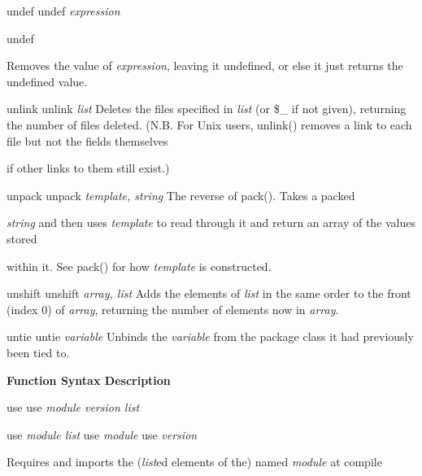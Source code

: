 \documentclass[a4paper,11pt]{book}
\begin{document}
\noindent 

\noindent undef undef \textit{expression}

\noindent 

\noindent undef

\noindent Removes the value of \textit{expression}, leaving it undefined, or else it just returns the undefined value.

\noindent 

\noindent unlink unlink \textit{list }Deletes the files specified in \textit{list }(or \$\_ if not given), returning the number of files deleted. (N.B. For Unix users, unlink() removes a link to each file but not the fields themselves

\noindent if other links to them still exist.)

\noindent 

\noindent 

\noindent unpack unpack \textit{template, string }The reverse of pack(). Takes a packed

\noindent \textit{string }and then uses \textit{template }to read through it and return an array of the values stored

\noindent within it. See pack() for how \textit{template }is constructed.

\noindent 

\noindent 

\noindent unshift unshift \textit{array, list }Adds the elements of \textit{list }in the same order to the front (index 0) of \textit{array}, returning the number of elements now in \textit{array}.

\noindent 

\noindent 

\noindent untie untie \textit{variable }Unbinds the \textit{variable }from the package class it had previously been tied to.

\noindent 

\noindent 

\noindent \textbf{Function Syntax Description}

\noindent 

\noindent use use \textit{module version list}

\noindent 

\noindent use \textit{module list }use \textit{module }use \textit{version}

\noindent 

\noindent Requires and imports the (\textit{list}ed elements of the) named \textit{module }at compile
\end{document}
